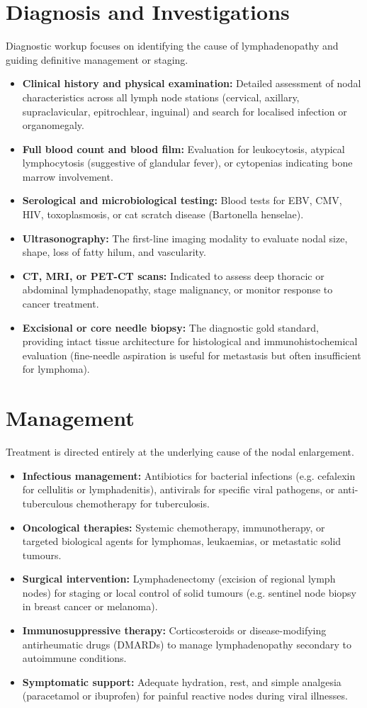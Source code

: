 \section*{Diagnosis and Investigations}
Diagnostic workup focuses on identifying the cause of lymphadenopathy and guiding definitive management or staging.
\begin{itemize}
    \item \textbf{Clinical history and physical examination:} Detailed assessment of nodal characteristics across all lymph node stations (cervical, axillary, supraclavicular, epitrochlear, inguinal) and search for localised infection or organomegaly.
    \item \textbf{Full blood count and blood film:} Evaluation for leukocytosis, atypical lymphocytosis (suggestive of glandular fever), or cytopenias indicating bone marrow involvement.
    \item \textbf{Serological and microbiological testing:} Blood tests for EBV, CMV, HIV, toxoplasmosis, or cat scratch disease (Bartonella henselae).
    \item \textbf{Ultrasonography:} The first-line imaging modality to evaluate nodal size, shape, loss of fatty hilum, and vascularity.
    \item \textbf{CT, MRI, or PET-CT scans:} Indicated to assess deep thoracic or abdominal lymphadenopathy, stage malignancy, or monitor response to cancer treatment.
    \item \textbf{Excisional or core needle biopsy:} The diagnostic gold standard, providing intact tissue architecture for histological and immunohistochemical evaluation (fine-needle aspiration is useful for metastasis but often insufficient for lymphoma).
\end{itemize}

\section*{Management}
Treatment is directed entirely at the underlying cause of the nodal enlargement.
\begin{itemize}
    \item \textbf{Infectious management:} Antibiotics for bacterial infections (e.g. cefalexin for cellulitis or lymphadenitis), antivirals for specific viral pathogens, or anti-tuberculous chemotherapy for tuberculosis.
    \item \textbf{Oncological therapies:} Systemic chemotherapy, immunotherapy, or targeted biological agents for lymphomas, leukaemias, or metastatic solid tumours.
    \item \textbf{Surgical intervention:} Lymphadenectomy (excision of regional lymph nodes) for staging or local control of solid tumours (e.g. sentinel node biopsy in breast cancer or melanoma).
    \item \textbf{Immunosuppressive therapy:} Corticosteroids or disease-modifying antirheumatic drugs (DMARDs) to manage lymphadenopathy secondary to autoimmune conditions.
    \item \textbf{Symptomatic support:} Adequate hydration, rest, and simple analgesia (paracetamol or ibuprofen) for painful reactive nodes during viral illnesses.
\end{itemize}

